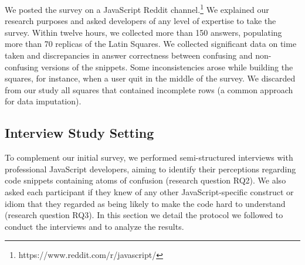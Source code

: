 
We posted the survey on a JavaScript Reddit channel.\footnote{https://www.reddit.com/r/javascript/} We explained our research purposes and asked developers of any level of expertise to take the survey. Within twelve hours, we collected more than 150 answers, populating more than 70 replicas of the Latin Squares. We collected significant data on time taken and discrepancies in answer correctness between confusing and non-confusing versions of the snippets. Some inconsistencies arose while building the squares, for instance, when a user quit in the middle of the survey. We discarded from our study all squares that contained incomplete rows (a common approach for data imputation).

 
\subsection{Interview Study Setting}

To complement our initial survey, we performed semi-structured interviews with professional JavaScript developers, aiming to identify their perceptions regarding code snippets containing atoms of confusion (research question RQ2). We also asked each participant if they knew of any other JavaScript-specific construct or idiom that they regarded as being likely to make the code hard to understand (research question RQ3). In this section we detail the protocol we followed to conduct the interviews and to analyze the results.


